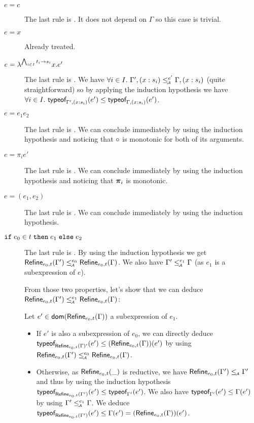 \documentclass[a4paper]{article}
\theoremstyle{definition}
\begin{document}
  \begin{description}
    \item[$e=c$] The last rule is . It does not depend on $\Gamma$ so this case is trivial.
    \item[$e=x$] Already treated.
    \item[$e=\lambda^{\bigwedge_{i\in I} \arrow {t_i}{s_i}}x.e'$]
    The last rule is .
    We have $\forall i\in I.\ \Gamma', (x:s_i) \leqA^{e'} \Gamma, (x:s_i)$ (quite straightforward)
    so by applying the induction hypothesis we have $\forall i\in I.\ \tyof {e'} {\Gamma', (x:s_i)} \leq \tyof {e'} {\Gamma, (x:s_i)}$.

    \item[$e=e_1 e_2$] The last rule is .
    We can conclude immediately by using the induction hypothesis and noticing that $\apply {} {}$ is monotonic for both of its arguments.

    \item[$e=\pi_i e'$] The last rule is .
    We can conclude immediately by using the induction hypothesis and noticing that $\bpi_i$ is monotonic.
     
    \item[$e=(e_1,e_2)$] The last rule is .
    We can conclude immediately by using the induction hypothesis.

    \item[$\ite {e_0} t {e_1} {e_2}$] The last rule is .
    By using the induction hypothesis we get $\Refine {e_0,t} {\Gamma'} \leqA^{e_0} \Refine {e_0,t} \Gamma$.
    We also have $\Gamma' \leqA^{e_1} \Gamma$ (as $e_1$ is a subexpression of $e$).

    From those two properties, let's show that we can deduce $\Refine {e_0,t} {\Gamma'} \leqA^{e_1} \Refine {e_0,t} \Gamma$:

    Let $e'\in\dom{\Refine {e_0,t} \Gamma}$ a subexpression of $e_1$.
    \begin{itemize}
      \item If $e'$ is also a subexpression of $e_0$, we can directly deduce
      $\tyof {e'} {\Refine {e_0,t} \Gamma'} \leq (\Refine {e_0,t} \Gamma) (e')$
      by using $\Refine {e_0,t} {\Gamma'} \leqA^{e_0} \Refine {e_0,t} \Gamma$.

      \item Otherwise, as $\Refine {e_0,t} {\_}$ is reductive,
      we have $\Refine {e_0,t} {\Gamma'} \leqA \Gamma'$ and thus by using the induction hypothesis
      $\tyof {e'} {\Refine {e_0,t} {\Gamma'}} \leq \tyof {e'} {\Gamma'}$.
      We also have $\tyof {e'} {\Gamma'} \leq \Gamma(e')$ by using $\Gamma' \leqA^{e_1} \Gamma$.
      We deduce $\tyof {e'} {\Refine {e_0,t} {\Gamma'}} \leq \Gamma(e') = (\Refine {e_0,t} \Gamma) (e')$.
    \end{itemize}
    

\end{description}
\end{document}

